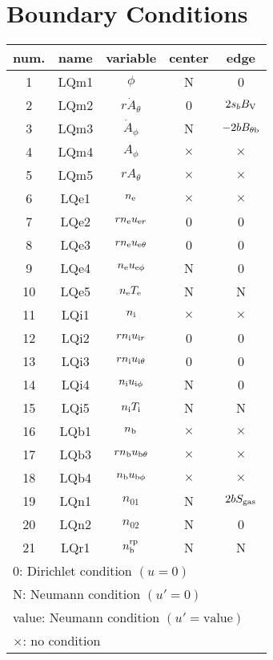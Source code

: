 \documentclass[11pt]{article}
\def\r#1{{\rm#1}}
\def\ne{n_\r{e}}
\def\ni{n_\r{i}}
\def\nb{n_\r{b}}
\def\uer{u_{\r{e}r}}
\def\uir{u_{\r{i}r}}
\def\ueth{u_{\r{e}\theta}}
\def\uith{u_{\r{i}\theta}}
\def\ubth{u_{\r{b}\theta}}
\def\ueph{u_{\r{e}\phi}}
\def\uiph{u_{\r{i}\phi}}
\def\ubph{u_{\r{b}\phi}}
\def\Athd{\dot{A}_\theta}
\def\Aphd{\dot{A}_\phi}
\def\Ath{A_\theta}
\def\Aph{A_\phi}
\def\Te{T_\r{e}}
\def\Ti{T_\r{i}}
\def\nna{n_{01}}
\def\nnb{n_{02}}
\def\nbrp{n_\r{b}^\r{rp}}
\begin{document}
\bigskip

\section{Boundary Conditions}

\begin{tabular}{|c|c|c|c|c|}\hline
 num. & name & variable      & center & edge \\\hline
 1    & LQm1 & $\phi$        & N        & 0\\
 2    & LQm2 & $r \Athd$     & 0        & $2s_b B_\r{V}$\\
 3    & LQm3 & $\Aphd$       & N        & $-2bB_{\theta\r{b}}$\\
 4    & LQm4 & $\Aph$        & $\times$ & $\times$\\
 5    & LQm5 & $r \Ath$      & $\times$ & $\times$\\
 6    & LQe1 & $\ne$         & $\times$ & $\times$\\
 7    & LQe2 & $r \ne \uer$  & 0        & 0\\
 8    & LQe3 & $r \ne \ueth$ & 0        & 0\\
 9    & LQe4 & $\ne \ueph$   & N        & 0\\
 10   & LQe5 & $\ne \Te$     & N        & N\\
 11   & LQi1 & $\ni$         & $\times$ & $\times$\\
 12   & LQi2 & $r \ni \uir$  & 0        & 0\\
 13   & LQi3 & $r \ni \uith$ & 0        & 0\\
 14   & LQi4 & $\ni \uiph$   & N        & 0\\
 15   & LQi5 & $\ni \Ti$     & N        & N\\
 16   & LQb1 & $\nb$         & $\times$ & $\times$\\
 17   & LQb3 & $r \nb \ubth$ & $\times$ & $\times$\\
 18   & LQb4 & $\nb \ubph$   & $\times$ & $\times$\\
 19   & LQn1 & $\nna$        & N        & $2bS_\r{gas}$\\
 20   & LQn2 & $\nnb$        & N        & 0\\
 21   & LQr1 & $\nbrp$       & N        & N\\\hline
 \multicolumn{5}{l}{0: Dirichlet condition $(u=0)$}\\
 \multicolumn{5}{l}{N: Neumann condition $(u'=0)$}\\
 \multicolumn{5}{l}{value: Neumann condition $(u'=\mbox{value})$}\\
 \multicolumn{5}{l}{$\times$: no condition}
\end{tabular}
\end{document}
